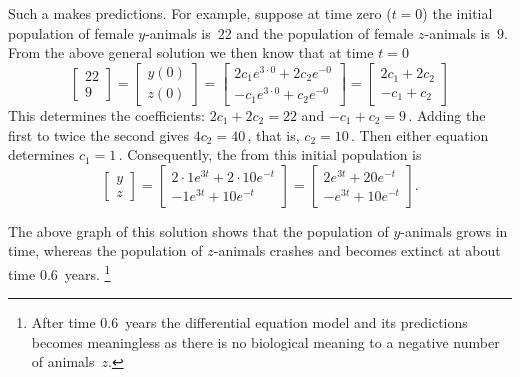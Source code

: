 Such a  makes predictions. 
For example, suppose at time zero (\(t=0\)) the initial population of female \(y\)-animals is~\(22\) and the population of female \(z\)-animals is~\(9\).
From the above general solution we then know that at time \(t=0\)
\begin{equation*}
\begin{bmatrix} 22\\9 \end{bmatrix}=
\begin{bmatrix} y(0)\\z(0) \end{bmatrix}
=\begin{bmatrix} 2c_1e^{3\cdot0}+2c_2e^{-0}
\\ -c_1e^{3\cdot0}+c_2e^{-0} \end{bmatrix}
=\begin{bmatrix} 2c_1+2c_2
\\ -c_1+c_2 \end{bmatrix}
\end{equation*}
This determines the coefficients: \(2c_1+2c_2=22\)
and \(-c_1+c_2=9\)\,.
Adding the first to twice the second gives \(4c_2=40\)\,, that is, \(c_2=10\)\,.
Then either equation determines \(c_1=1\)\,.
Consequently, the  from this initial population is
\begin{equation*}
\begin{bmatrix} y\\z \end{bmatrix}
=\begin{bmatrix} 2\cdot1e^{3t}+2\cdot10e^{-t}
\\ -1e^{3t}+10e^{-t}\end{bmatrix}
=\begin{bmatrix} 2e^{3t}+20e^{-t}
\\ -e^{3t}+10e^{-t}\end{bmatrix}.
\end{equation*}
\begin{center}
\end{center}
The above graph of this solution shows that the population of \(y\)-animals grows in time, whereas the population of \(z\)-animals crashes and becomes extinct at about time \(0.6\)~years.%
\footnote{After time \(0.6\)~years the differential equation model  and its predictions becomes meaningless as there is no biological meaning to a negative number of animals~\(z\).}


